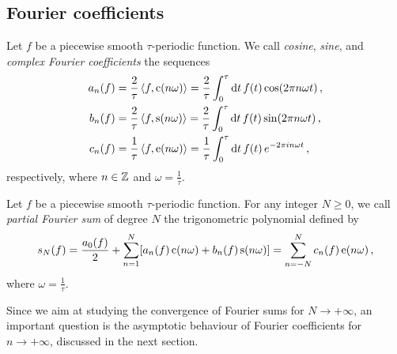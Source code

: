 \subsection{Fourier coefficients}
\begin{definition}
  \label{def:fourier-coef}
  Let $f$ be a piecewise smooth $\tau$-periodic function. We call \emph{cosine},
  \emph{sine}, and \emph{complex Fourier coefficients} the sequences
  \begin{align}
    a_n(f)&=\frac{2}{\tau}\braket{f,\operatorname{c}(n\omega)}
    =\frac{2}{\tau}\int_0^{\tau}\mathrm{d} t\,f(t)\cos(2\pi n\omega t)\,,
    \label{eq:fourier-an}\\
    b_n(f)&=\frac{2}{\tau}\braket{f,\operatorname{s}(n\omega)}
    =\frac{2}{\tau}\int_0^{\tau}\mathrm{d} t\,f(t)\sin(2\pi n\omega t)\,,
    \label{eq:fourier-bn}\\
    c_n(f)&=\frac{1}{\tau}\braket{f,\operatorname{e}(n\omega)}
    =\frac{1}{\tau}\int_0^{\tau}\mathrm{d} t\,f(t)\,e^{-2\pi i n\omega t}\,,
    \label{eq:fourier-cn}
  \end{align}
  respectively, where $n\in\mathbb{Z}$ and $\omega=\frac{1}{\tau}$.
\end{definition}
\begin{definition}
  \label{def:fourier-partial}
  Let $f$ be a piecewise smooth $\tau$-periodic function. For any integer $N\geq 0$, we
  call \emph{partial Fourier sum} of degree $N$ the trigonometric polynomial defined by
  \begin{equation}
    s_N(f)=\frac{a_0(f)}{2}+\sum_{n=1}^N[a_n(f)\operatorname{c}(n\omega)+b_n(f)\operatorname{s}(n\omega)]=
    \sum_{n=-N}^{N}c_n(f)\operatorname{e}(n\omega)\,,
  \end{equation}
  where $\omega=\frac{1}{\tau}$.
\end{definition}
Since we aim at studying the convergence of Fourier sums for $N\to+\infty$, an important
question is the asymptotic behaviour of Fourier coefficients for $n\to+\infty$, discussed
in the next section.
